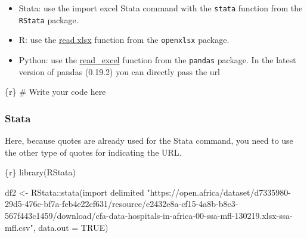 \documentclass[
  letterpaper,
  DIV=11,
  numbers=noendperiod,
  oneside]{scrreprt}
\newenvironment{Shaded}{\begin{snugshade}}{\end{snugshade}}
\newcommand{\AttributeTok}[1]{\textcolor[rgb]{0.40,0.45,0.13}{#1}}
\newcommand{\CommentTok}[1]{\textcolor[rgb]{0.37,0.37,0.37}{#1}}
\newcommand{\ConstantTok}[1]{\textcolor[rgb]{0.56,0.35,0.01}{#1}}
\newcommand{\FunctionTok}[1]{\textcolor[rgb]{0.28,0.35,0.67}{#1}}
\newcommand{\InformationTok}[1]{\textcolor[rgb]{0.37,0.37,0.37}{#1}}
\newcommand{\NormalTok}[1]{\textcolor[rgb]{0.00,0.23,0.31}{#1}}
\newcommand{\OtherTok}[1]{\textcolor[rgb]{0.00,0.23,0.31}{#1}}
\newcommand{\SpecialCharTok}[1]{\textcolor[rgb]{0.37,0.37,0.37}{#1}}
\newcommand{\StringTok}[1]{\textcolor[rgb]{0.13,0.47,0.30}{#1}}
\providecommand{\tightlist}{%
  \setlength{\itemsep}{0pt}\setlength{\parskip}{0pt}}\usepackage{longtable,booktabs,array}
\begin{document}
\begin{tcolorbox}[enhanced jigsaw, colbacktitle=quarto-callout-tip-color!10!white, titlerule=0mm, breakable, opacityback=0, opacitybacktitle=0.6, left=2mm, coltitle=black, colback=white, title=\textcolor{quarto-callout-tip-color}{\faLightbulb}\hspace{0.5em}{Tip}, rightrule=.15mm, colframe=quarto-callout-tip-color-frame, toprule=.15mm, bottomtitle=1mm, toptitle=1mm, arc=.35mm, bottomrule=.15mm, leftrule=.75mm]

\begin{itemize}
\tightlist
\item
  Stata: use the import excel Stata command with the \texttt{stata}
  function from the \texttt{RStata} package.
\item
  R: use the
  \href{https://www.rdocumentation.org/packages/openxlsx/versions/4.2.5/topics/read.xlsx}{read.xlsx}
  function from the \texttt{openxlsx} package.
\item
  Python: use the
  \href{https://pandas.pydata.org/docs/reference/api/pandas.read_excel.html}{read\_excel}
  function from the \texttt{pandas} package. In the latest version of
  pandas (0.19.2) you can directly pass the url
\end{itemize}

\end{tcolorbox}

\begin{Shaded}
\begin{Highlighting}[]
\InformationTok{\textasciigrave{}\textasciigrave{}\textasciigrave{}\{r\}}
\CommentTok{\# Write your code here}
\InformationTok{\textasciigrave{}\textasciigrave{}\textasciigrave{}}
\end{Highlighting}
\end{Shaded}

\hypertarget{stata-3}{%
\subsubsection{Stata}\label{stata-3}}

Here, because quotes are already used for the Stata command, you need to
use the other type of quotes for indicating the URL.

\begin{Shaded}
\begin{Highlighting}[]
\InformationTok{\textasciigrave{}\textasciigrave{}\textasciigrave{}\{r\}}
\FunctionTok{library}\NormalTok{(RStata)}

\NormalTok{df2 }\OtherTok{\textless{}{-}}\NormalTok{ RStata}\SpecialCharTok{::}\FunctionTok{stata}\NormalTok{(}\StringTok{\textquotesingle{}import delimited "https://open.africa/dataset/d7335980{-}29d5{-}476c{-}bf7a{-}feb4e22cf631/resource/e2432e8a{-}cf15{-}4a8b{-}b8c3{-}567f443c1459/download/cfa{-}data{-}hospitals{-}in{-}africa{-}00{-}ssa{-}mfl{-}130219.xlsx{-}ssa{-}mfl.csv"\textquotesingle{}}\NormalTok{,}
                     \AttributeTok{data.out =} \ConstantTok{TRUE}\NormalTok{)}
\InformationTok{\textasciigrave{}\textasciigrave{}\textasciigrave{}}
\end{Highlighting}
\end{Shaded}
\end{document}

